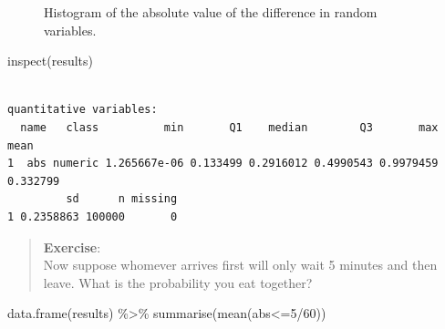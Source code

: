 \documentclass[
  letterpaper,
  DIV=11,
  numbers=noendperiod]{scrreprt}
\newenvironment{Shaded}{\begin{snugshade}}{\end{snugshade}}
\newcommand{\DecValTok}[1]{\textcolor[rgb]{0.68,0.00,0.00}{#1}}
\newcommand{\FunctionTok}[1]{\textcolor[rgb]{0.28,0.35,0.67}{#1}}
\newcommand{\NormalTok}[1]{\textcolor[rgb]{0.00,0.23,0.31}{#1}}
\newcommand{\SpecialCharTok}[1]{\textcolor[rgb]{0.37,0.37,0.37}{#1}}
\begin{document}
\begin{figure}[H]


\caption{\label{fig-hist163}Histogram of the absolute value of the
difference in random variables.}

\end{figure}%

\begin{Shaded}
\begin{Highlighting}[]
\FunctionTok{inspect}\NormalTok{(results)}
\end{Highlighting}
\end{Shaded}

\begin{verbatim}

quantitative variables:  
  name   class          min       Q1    median        Q3       max     mean
1  abs numeric 1.265667e-06 0.133499 0.2916012 0.4990543 0.9979459 0.332799
         sd      n missing
1 0.2358863 100000       0
\end{verbatim}

\begin{quote}
\textbf{Exercise}:\\
Now suppose whomever arrives first will only wait 5 minutes and then
leave. What is the probability you eat together?
\end{quote}

\begin{Shaded}
\begin{Highlighting}[]
\FunctionTok{data.frame}\NormalTok{(results) }\SpecialCharTok{\%\textgreater{}\%}
  \FunctionTok{summarise}\NormalTok{(}\FunctionTok{mean}\NormalTok{(abs}\SpecialCharTok{\textless{}=}\DecValTok{5}\SpecialCharTok{/}\DecValTok{60}\NormalTok{))}
\end{Highlighting}
\end{Shaded}
\end{document}

